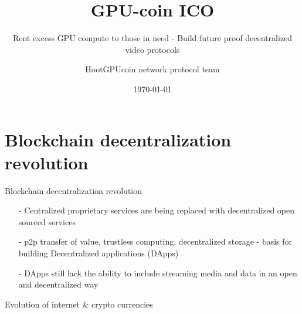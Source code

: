 \documentclass[10pt,handout]{beamer}
\title{ GPU-coin ICO}
\subtitle{Rent excess GPU compute to those in need - Build future proof decentralized video protocols }
\date{\today}
\author{HootGPUcoin network protocol team}
\institute{HootGPUcoin Foundation}
\begin{document}
\maketitle


\section{Blockchain decentralization revolution}
\begin{frame}[fragile]{Blockchain decentralization revolution}
 \begin{itemize}[<+-| alert@+>]%
	 
\item[-]Centralized proprietary services are being replaced with decentralized open sourced services
\item[-]p2p transfer of value, trustless computing, decentralized storage - basis for building Decentralized applications (DApps)
\item[-]DApps still lack the ability to include streaming media and data in an open and decentralized way
\end{itemize}

\end{frame}

\begin{frame}[t]{Evolution of internet \& crypto currencies}
 

\end{frame} 
\end{document}
